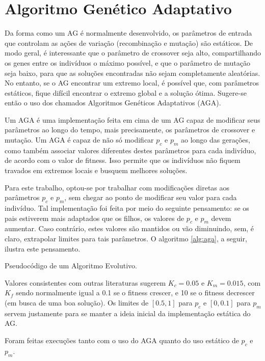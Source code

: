 \section{Algoritmo Genético Adaptativo}

Da forma como um AG é normalmente desenvolvido, os parâmetros de entrada que controlam as ações de variação (recombinação e mutação) são estáticos. De modo geral, é interessante que o parâmetro de crossover seja alto, compartilhando os genes entre os indivíduos o máximo possível, e que o parâmetro de mutação seja baixo, para que as soluções encontradas não sejam completamente aleatórias. No entanto, se o AG encontrar um extremo local, é possível que, com parâmetros estáticos, fique difícil encontrar o extremo global e a solução ótima. Sugere-se então o uso dos chamados Algoritmos Genéticos Adaptativos (AGA).

Um AGA é uma implementação feita em cima de um AG capaz de modificar seus parâmetros ao longo do tempo, mais precisamente, os parâmetros de crossover e mutação. Um AGA é capaz de não só modificar $p_c$ e $p_m$ ao longo das gerações, como também associar valores diferentes destes parâmetros para cada indivíduo, de acordo com o valor de fitness. Isso permite que os indivíduos não fiquem travados em extremos locais e busquem melhores soluções.

Para este trabalho, optou-se por trabalhar com modificações diretas aos parâmetros $p_c$ e $p_m$, sem chegar ao ponto de modificar seu valor para cada indivíduo. Tal implementação foi feita por meio do seguinte pensamento: se os pais estiverem mais adaptados que os filhos, os valores de $p_c$ e $p_m$ devem aumentar. Caso contrário, estes valores são mantidos ou vão diminuindo, sem, é claro, extrapolar limites para tais parâmetros. O algoritmo \ref{alg:aga}, a seguir, ilustra este pensamento.

\begin{algorithm}[H]
\caption{Pseudocódigo de um Algoritmo Evolutivo.}
\label{alg:aga}
\end{algorithm}

Valores consistentes com outras literaturas sugerem $K_c = 0.05$ e $K_m = 0.015$, com $K_f$ sendo normalmente igual a 0.1 se o fitness crescer, e 10 se o fitness decrescer (em busca de uma boa solução). Os limites de $[0.5, 1]$ para $p_c$ e $[0, 0.1]$ para $p_m$ servem justamente para se manter a ideia inicial da implementação estática do AG.

Foram feitas execuções tanto com o uso do AGA quanto do uso estático de $p_c$ e $p_m$.

